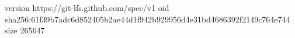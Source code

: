 version https://git-lfs.github.com/spec/v1
oid sha256:61f39b7adc6d852405b2ae44d1f942b929956d4e31bd4686392f2149c764e744
size 265647
